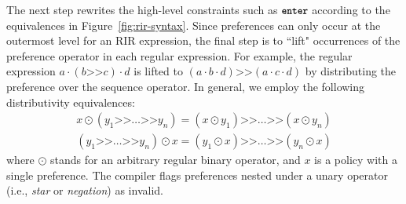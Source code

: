 \documentclass[10pt]{sigalternate052015}
\newcommand{\KW}[1]{\texttt{\small\bfseries{#1}}}
\newcommand{\Prefer}{\texttt{>>}}
\newcommand{\Enter}{\KW{enter}}
\renewcommand{\path}[2]{ #1 \mapsto \ensuremath{#2} }
\begin{document}
The next step rewrites the high-level constraints such as $\Enter$ according to the equivalences in Figure~\ref{fig:rir-syntax}. Since preferences can only occur at the outermost level for an RIR expression, the final step is to ``lift" occurrences of the preference operator in each regular expression. For example, the regular expression $a \cdot (b \Prefer c) \cdot d$ is lifted to $(a \cdot b \cdot d) \Prefer (a \cdot c \cdot d)$ by distributing the preference over the sequence operator. In general, we employ the following distributivity equivalences:
%
\[
\begin{array}{c}
  x \odot (y_1 \Prefer \dots \Prefer y_n) = (x \odot y_1) \Prefer \dots \Prefer (x \odot y_n) \\
  (y_1 \Prefer \dots \Prefer y_n) \odot x = (y_1 \odot x) \Prefer \dots \Prefer (y_n \odot x)
\end{array}
\]
%
where $\odot$ stands for an arbitrary regular binary operator, and $x$ is a policy with a single preference. The compiler flags preferences nested under a unary operator (i.e., \textit{star} or \textit{negation}) as invalid.





\newcommand{\state}[4]{\node[state,#3](#1)[#4]{#2};}
\newcommand{\transition}[4]{\path[->] (#1) edge [#4] node {#3} (#2);}
\end{document}
